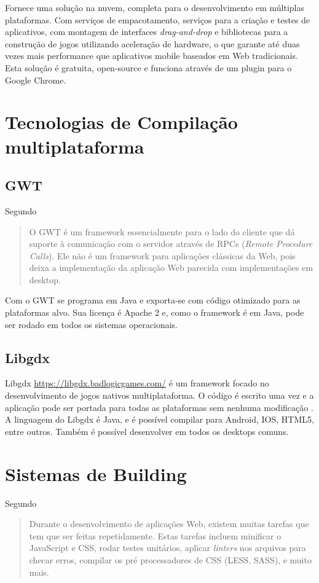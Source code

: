 Fornece uma solução na nuvem, completa para o desenvolvimento em
múltiplas plataformas. Com serviços de empacotamento, serviços
para a criação e testes de aplicativos, com montagem de interfaces
\textit{drag-and-drop} e bibliotecas para a construção de jogos
utilizando aceleração de hardware, o que garante até duas vezes mais
performance que aplicativos mobile baseados em Web tradicionais. Esta
solução é gratuita, open-source e funciona através de um plugin para
o Google Chrome.

\chapter{Tecnologias de Compilação multiplataforma}

\section{GWT}
Segundo \citet[p. 29]{gwt}
\begin{quote}
O GWT é um framework essencialmente para o lado do cliente que dá
suporte à comunicação com o servidor através de RPCs (\textit{Remote
Procedure Calls}). Ele não é um framework para aplicações clássicas
da Web, pois deixa a implementação da aplicação Web parecida com
implementações em desktop.
\end{quote}

Com o GWT se programa em Java e exporta-se com código otimizado para
as plataformas alvo. Sua licença é Apache 2 e, como o framework é em
Java, pode ser rodado em todos os sistemas operacionais.

\section{Libgdx}

Libgdx \url{https://libgdx.badlogicgames.com/} é um framework
focado no desenvolvimento de jogos nativos multiplataforma. O
código é escrito uma vez e a aplicação pode ser portada para
todas as plataformas sem nenhuma modificação \autocite[p.
8]{crossPlatformMobileGameDevelopment}. A linguagem do Libgdx é Java, e
é possível compilar para Android, IOS, HTML5, entre outros. Também é
possível desenvolver em todos os desktops comuns.

\chapter{Sistemas de Building}

Segundo \citet{gruntTutorial}
\begin{quote}
Durante o desenvolvimento de aplicações Web, existem muitas tarefas
que tem que ser feitas repetidamente. Estas tarefas incluem minificar o
JavaScript e CSS, rodar testes unitários, aplicar \textit{linters} nos
arquivos para checar erros, compilar os pré processadores de CSS (LESS,
SASS), e muito mais.
\end{quote}

